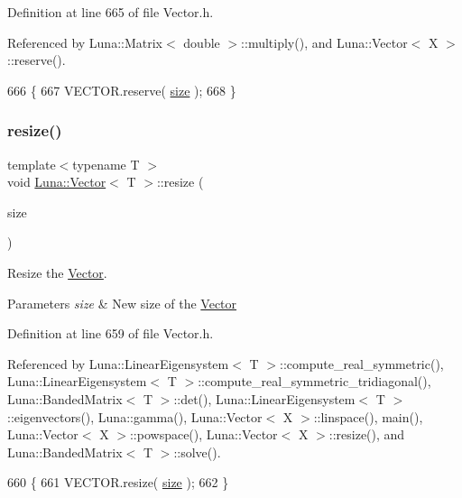 Definition at line 665 of file Vector.\+h.



Referenced by Luna\+::\+Matrix$<$ double $>$\+::multiply(), and Luna\+::\+Vector$<$ X $>$\+::reserve().


\begin{DoxyCode}
666   \{
667     VECTOR.reserve( \hyperlink{classLuna_1_1Vector_ac9b6ed7a0df401728f27c193fbc8f4d8}{size} );
668   \}
\end{DoxyCode}
\mbox{\label{classLuna_1_1Vector_ae1394f960d5cac3e60f6b1561f38e453}} 
\subsubsection{\texorpdfstring{resize()}{resize()}}
{\footnotesize\ttfamily template$<$typename T $>$ \\
void \hyperlink{classLuna_1_1Vector}{Luna\+::\+Vector}$<$ T $>$\+::resize (\begin{DoxyParamCaption}\item[{const std\+::size\+\_\+t \&}]{size }\end{DoxyParamCaption})\hspace{0.3cm}{\ttfamily [inline]}}



Resize the \hyperlink{classLuna_1_1Vector}{Vector}. 


\begin{DoxyParams}{Parameters}
{\em size} & New size of the \hyperlink{classLuna_1_1Vector}{Vector} \\
\hline
\end{DoxyParams}


Definition at line 659 of file Vector.\+h.



Referenced by Luna\+::\+Linear\+Eigensystem$<$ T $>$\+::compute\+\_\+real\+\_\+symmetric(), Luna\+::\+Linear\+Eigensystem$<$ T $>$\+::compute\+\_\+real\+\_\+symmetric\+\_\+tridiagonal(), Luna\+::\+Banded\+Matrix$<$ T $>$\+::det(), Luna\+::\+Linear\+Eigensystem$<$ T $>$\+::eigenvectors(), Luna\+::gamma(), Luna\+::\+Vector$<$ X $>$\+::linspace(), main(), Luna\+::\+Vector$<$ X $>$\+::powspace(), Luna\+::\+Vector$<$ X $>$\+::resize(), and Luna\+::\+Banded\+Matrix$<$ T $>$\+::solve().


\begin{DoxyCode}
660   \{
661     VECTOR.resize( \hyperlink{classLuna_1_1Vector_ac9b6ed7a0df401728f27c193fbc8f4d8}{size} );
662   \}
\end{DoxyCode}
\mbox{\label{classLuna_1_1Vector_a0e051d73b35c094dddef2ea46b4935df}} 

